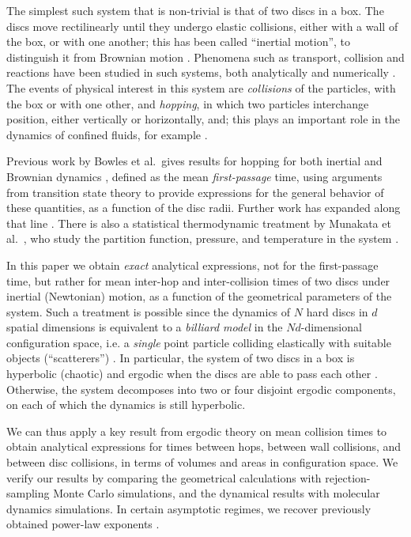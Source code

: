 \documentclass[superscriptaddress,pre,reprint,showpacs,twocolumn]{revtex4-1}
\newcommand{\etal}{et al.\ }
\begin{document}
The simplest such system that is non-trivial is that of two discs in a box.
The discs move rectilinearly until they undergo
elastic collisions, either with a wall of the box, or with one another; this has been called ``inertial motion'', to distinguish it from Brownian motion \cite{Bowles04}.
Phenomena such as transport, collision and reactions
have been studied in such systems, both analytically 
 \cite{Awazu01, Munakata02, Suh05} and numerically \cite{MacElroy2004, MacElroy2005}.
The events of physical interest in this system are \emph{collisions} of the particles, with the box or with one other, and \emph{hopping},
in which two particles interchange position, either vertically or horizontally,
and; this plays an important role in the dynamics of confined fluids, for example \cite{Bowles04}.

 
Previous work
by Bowles \etal gives results for hopping
for both inertial and Brownian dynamics \cite{Bowles04}, defined as 
the mean \emph{first-passage} time, using arguments from transition state theory 
to provide expressions for the general behavior of these quantities, as a function of the
disc radii. %
Further work has expanded along that line  \cite{Suh05, Ball09}.
There is also a statistical thermodynamic treatment by Munakata \etal, 
who study the partition function, pressure,
and temperature in the system \cite{Munakata02, Munakata06}. 


In this paper we obtain \emph{exact} analytical expressions, not for the first-passage time,
but rather for mean inter-hop and inter-collision times of two discs under 
inertial (Newtonian) motion, as a function of the geometrical parameters of the system. Such a treatment is possible
 since the dynamics of $N$ hard discs in $d$ spatial dimensions
 is equivalent to a \emph{billiard model} in the $Nd$-dimensional configuration space, i.e. a \emph{single} point particle colliding elastically 
with suitable objects (``scatterers'') \cite{SzaszBook00}. 
In particular, the system of two discs in a box is hyperbolic (chaotic) and ergodic when the discs are able to pass each other \cite{Sim99}. Otherwise, the system decomposes into
two or four disjoint ergodic components, on each of which the dynamics is still hyperbolic.

We can thus apply a key result from ergodic theory on mean collision times \cite{Chernov97} to obtain analytical expressions 
for times between hops, between wall collisions, and between disc collisions, in terms of volumes and areas in configuration space. We verify our results by comparing the geometrical calculations with rejection-sampling Monte Carlo simulations, and the dynamical results with molecular dynamics simulations.
In certain asymptotic regimes, we recover previously obtained power-law exponents \cite{Bowles04}.
\end{document}
